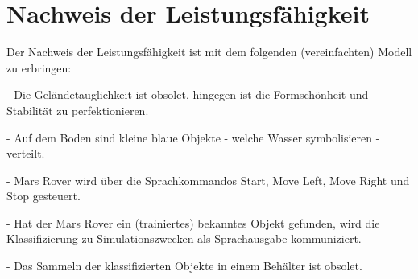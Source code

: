 \chapter{Nachweis der Leistungsfähigkeit}
\label{chp:nachweis_leistungsfaehigkeit}

Der Nachweis der Leistungsfähigkeit ist mit dem folgenden (vereinfachten) Modell zu erbringen:

- Die Geländetauglichkeit ist obsolet, hingegen ist die Formschönheit und Stabilität zu perfektionieren.

- Auf dem Boden sind kleine blaue Objekte - welche Wasser symbolisieren - verteilt.

- Mars Rover wird über die Sprachkommandos Start, Move Left, Move Right und Stop gesteuert.

- Hat der Mars Rover ein (trainiertes) bekanntes Objekt gefunden, wird die Klassifizierung zu Simulationszwecken als Sprachausgabe kommuniziert.

- Das Sammeln der klassifizierten Objekte in einem Behälter ist obsolet.